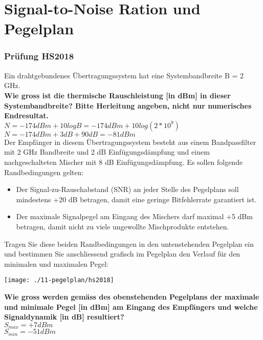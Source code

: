 

\section{Signal-to-Noise Ration und Pegelplan}

\subsubsection{Prüfung HS2018}
Ein drahtgebundenes Übertragungssystem hat eine Systembandbreite B = 2 GHz.\\

\textbf{Wie gross ist die thermische Rauschleistung [in dBm] in dieser Systembandbreite? Bitte Herleitung angeben, nicht nur numerisches Endresultat.}\\
$N=-174dBm+10logB=-174dBm+10log(2*10^9)$\\
$N=-174dBm + 3 dB + 90 dB = -81dBm$\\

Der Empfänger in diesem Übertragungssystem besteht aus einem Bandpassfilter mit 2 GHz Bandbreite und 2 dB Einfügungsdämpfung und einem nachgeschalteten Mischer
mit 8 dB Einfügungsdämpfung. Es sollen folgende Randbedingungen gelten:\\
\begin{itemize}
    \item Der Signal-zu-Rauschabstand (SNR) an jeder Stelle des Pegelplans soll mindestens +20 dB betragen, damit eine geringe Bitfehlerrate garantiert ist.
    \item Der maximale Signalpegel am Eingang des Mischers darf maximal +5 dBm betragen, damit nicht zu viele ungewollte Mischprodukte entstehen.\\
\end{itemize}

Tragen Sie diese beiden Randbedingungen in den untenstehenden Pegelplan ein und bestimmen Sie anschliessend grafisch im Pegelplan den Verlauf für den minimalen und
maximalen Pegel:
\begin{center}
    \vspace{-8pt}
    \texttt{[image: ./11-pegelplan/hs2018]}
    \vspace{-8pt}
\end{center}

\textbf{Wie gross werden gemäss des obenstehenden Pegelplans der maximale und minimale Pegel [in dBm] am Eingang des Empfängers und welche Signaldynamik [in dB] resultiert?}\\
$S_{max}=+7dBm$\\
$S_{min}=-51dBm$\\

